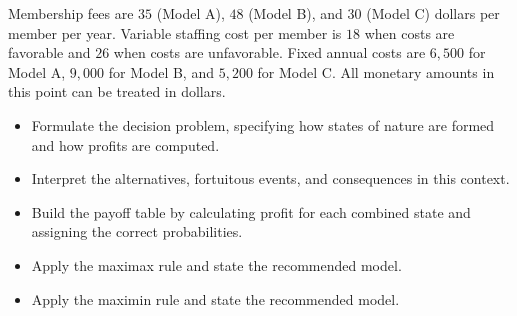 \begin{enumerate}
	Membership fees are $35$ (Model A), $48$ (Model B), and $30$ (Model C) dollars per member per year.
	Variable staffing cost per member is $18$ when costs are favorable and $26$ when costs are unfavorable.
	Fixed annual costs are $6{,}500$ for Model A, $9{,}000$ for Model B, and $5{,}200$ for Model C.
	All monetary amounts in this point can be treated in dollars.

	\begin{itemize}
		\item Formulate the decision problem, specifying how states of nature are formed and how profits are computed.
		\item Interpret the alternatives, fortuitous events, and consequences in this context.
		\item Build the payoff table by calculating profit for each combined state and assigning the correct probabilities.
		\item Apply the maximax rule and state the recommended model.
		\item Apply the maximin rule and state the recommended model.
	\end{itemize}
\end{enumerate}


